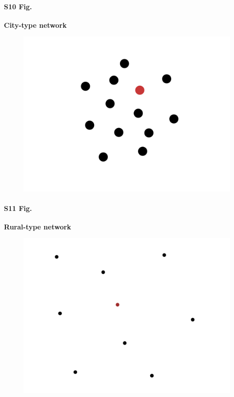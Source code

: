\documentclass[10pt,letterpaper]{article}
\begin{document}
\paragraph*{S10 Fig.}
\label{SI:S10_fig}
{\bf City-type network}
\begin{figure}[ht!]{\textwidth}
    \includegraphics[width=\textwidth]{figures/maps/map_city.pdf}
    \label{si:city}
\end{figure}

\paragraph*{S11 Fig.}
\label{SI:S11_fig}
{\bf Rural-type network}
\begin{figure}[ht!]{\textwidth}
    \includegraphics[width=\textwidth]{figures/maps/map_rural.pdf}
    \label{si:rural}
\end{figure}
\end{document}
